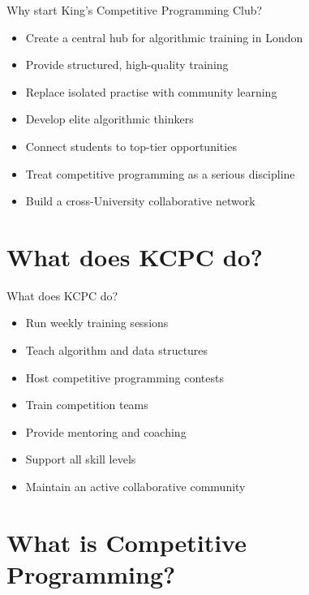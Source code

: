 \documentclass{beamer}
\begin{document}
\begin{frame}{Why start King’s Competitive Programming Club?}
    \begin{itemize}
        \item Create a central hub for algorithmic training in London
        \pause
        \item Provide structured, high-quality training
        \pause
        \item Replace isolated practise with community learning
        \pause
        \item Develop elite algorithmic thinkers
        \pause
        \item Connect students to top-tier opportunities
        \pause
        \item Treat competitive programming as a serious discipline
        \pause
        \item Build a cross-University collaborative network
    \end{itemize}
\end{frame}

\section{What does KCPC do?}

\begin{frame}{What does KCPC do?}
    \begin{itemize}
        \item Run weekly training sessions
        \pause
        \item Teach algorithm and data structures
        \pause
        \item Host competitive programming contests
        \pause
        \item Train competition teams
        \pause
        \item Provide mentoring and coaching
        \pause
        \item Support all skill levels
        \pause
        \item Maintain an active collaborative community
    \end{itemize}
\end{frame}

\section{What is Competitive Programming?}
\end{document}
